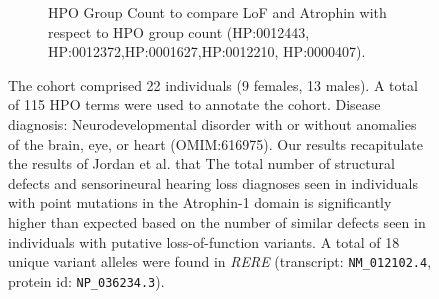 \begin{figure}[htbp]
\vspace{2em}

\begin{subfigure}[b]{0.95\textwidth}
\captionsetup{justification=raggedright,singlelinecheck=false}
\caption{HPO Group Count to compare LoF and Atrophin with respect to HPO group count (HP:0012443, HP:0012372,HP:0001627,HP:0012210, HP:0000407).}
\end{subfigure}

\vspace{2em}

\caption{ The cohort comprised 22 individuals (9 females, 13 males). A total of 115 HPO terms were used to annotate the cohort. 
Disease diagnosis: Neurodevelopmental disorder with or without anomalies of the brain, eye, or heart (OMIM:616975). 
Our results recapitulate the results of Jordan et al. \cite{PMID_29330883} that The total number of structural defects and sensorineural hearing loss diagnoses seen in individuals with point mutations in the 
Atrophin-1 domain is significantly higher than expected based on the number of similar defects seen in individuals with putative loss-of-function variants.
A total of 18 unique variant alleles were found in \textit{RERE} (transcript: \texttt{NM\_012102.4}, protein id: \texttt{NP\_036234.3}).}
\end{figure}
